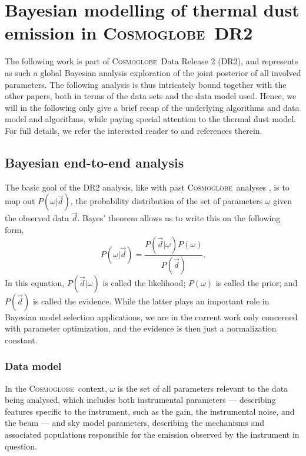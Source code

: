 \documentclass{aa}
\newcommand{\dv}[0]{\vec{d}}
\def\Cosmoglobe{\textsc{Cosmoglobe}}
\begin{document}
{\section{Bayesian modelling of thermal dust emission in \Cosmoglobe\ DR2}
\label{sec:dr2}

The following work is part of \Cosmoglobe\ Data Release 2 (DR2), and
represents as such a global Bayesian analysis exploration of the joint
posterior of all involved parameters. The following analysis is thus
intricately bound together with the other papers, both in terms of the
data sets and the data model used. Hence, we will in the following
only give a brief recap of the underlying algorithms and data model and
algorithms, while paying special attention to the thermal dust model. For full
details, we refer the interested reader to \citet{CG02_01} and
references therein.

\subsection{Bayesian end-to-end analysis}
The basic goal of the DR2 analysis, like with past \Cosmoglobe\ analyses \citep{bp01,watts2023_dr1},
is to map out $P(\omega | \dv)$, the probability distribution of
     the set of parameters $\omega$ given the observed data
     $\dv$. Bayes' theorem allows us to write this on the following
     form,
\begin{equation}
    \label{eq:bayestheorem}
    P(\omega|\dv) = \frac{P(\dv|\omega)P(\omega)}{P(\dv)}.
\end{equation}
In this equation, $P(\dv|\omega)$ is called the likelihood;
$P(\omega)$ is called the prior; and $P(\dv)$ is called the
evidence. While the latter plays an important role in Bayesian model
selection applications, we are in the current work only concerned with
parameter optimization, and the evidence is then just a normalization
constant.

\subsubsection{Data model}
In the \Cosmoglobe\ context, $\omega$ is the set of all parameters relevant to
the data being analysed, which includes both instrumental parameters ---
describing features specific to the instrument, such as the gain, the
instrumental noise, and the beam --- and sky model parameters, describing
the mechanisms and associated populations responsible for the emission observed
by the instrument in question.

}
\end{document}
